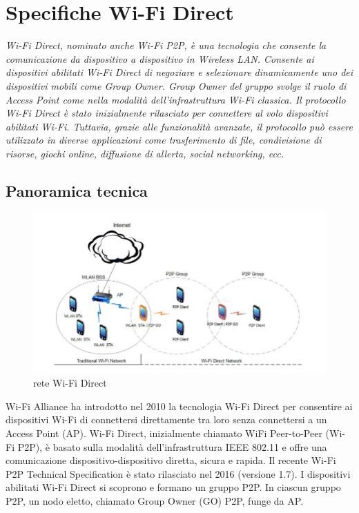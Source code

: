 \chapter{Specifiche Wi-Fi Direct}
\label{chap:basi}

\begin{minipage}{12cm}\textit{
Wi-Fi Direct, nominato anche Wi-Fi P2P, è una tecnologia
che consente la comunicazione da dispositivo a dispositivo in Wireless
LAN.
Consente ai dispositivi abilitati Wi-Fi Direct di negoziare e selezionare
dinamicamente
uno dei dispositivi mobili come Group Owner. Group Owner del gruppo
svolge
il ruolo di Access Point come nella modalità dell'infrastruttura Wi-Fi
classica. Il protocollo
Wi-Fi Direct è stato inizialmente rilasciato per connettere al volo dispositivi
abilitati Wi-Fi.
Tuttavia, grazie alle funzionalità avanzate, il protocollo può essere
utilizzato in diverse
applicazioni come trasferimento di file, condivisione di risorse, giochi
online, diffusione di
allerta, social networking, ecc.}

\end{minipage}

\vspace*{1cm}

\section{Panoramica tecnica}

\begin{figure}
\caption{rete Wi-Fi Direct}
\includegraphics[width=1\columnwidth]{imgs/wifip2pnet.jpg} %
\end{figure}


\label{sec:sezioni}
Wi-Fi Alliance ha introdotto nel 2010 la tecnologia Wi-Fi Direct per consentire
ai dispositivi
Wi-Fi di connettersi direttamente tra loro senza connettersi a un Access Point
(AP). Wi-Fi Direct,
inizialmente chiamato WiFi Peer-to-Peer (Wi-Fi P2P), è basato sulla modalità
dell'infrastruttura
IEEE 802.11 e offre una comunicazione dispositivo-dispositivo diretta, sicura e
rapida. Il recente
Wi-Fi P2P Technical Specification \cite{alliance2016wi} è stato rilasciato nel
2016 (versione 1.7).
I dispositivi abilitati Wi-Fi Direct si scoprono e formano un gruppo P2P. In
ciascun gruppo P2P,
un nodo eletto, chiamato Group Owner (GO) P2P, funge da AP.


